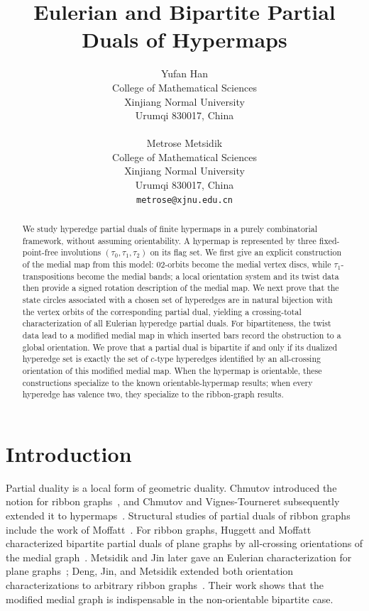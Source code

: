 \documentclass{article}
\title{Eulerian and Bipartite Partial Duals of Hypermaps}
\author{
 Yufan Han \\
  College of Mathematical Sciences\\
  Xinjiang Normal University\\
  Urumqi 830017, China \\
  \texttt{} \\
   \And
 Metrose Metsidik \\
  College of Mathematical Sciences\\
  Xinjiang Normal University\\
  Urumqi 830017, China \\
  \texttt{metrose@xjnu.edu.cn} \\
}
\theoremstyle{definition}
\theoremstyle{remark}
\begin{document}
\maketitle
\begin{abstract}
We study hyperedge partial duals of finite hypermaps in a purely combinatorial framework, without assuming orientability. A hypermap is represented by three fixed-point-free involutions $(\tau_0,\tau_1,\tau_2)$ on its flag set. We first give an explicit construction of the medial map from this model: $02$-orbits become the medial vertex discs, while $\tau_1$-transpositions become the medial bands; a local orientation system and its twist data then provide a signed rotation description of the medial map. We next prove that the state circles associated with a chosen set of hyperedges are in natural bijection with the vertex orbits of the corresponding partial dual, yielding a crossing-total characterization of all Eulerian hyperedge partial duals. For bipartiteness, the twist data lead to a modified medial map in which inserted bars record the obstruction to a global orientation. We prove that a partial dual is bipartite if and only if its dualized hyperedge set is exactly the set of $c$-type hyperedges identified by an all-crossing orientation of this modified medial map. When the hypermap is orientable, these constructions specialize to the known orientable-hypermap results; when every hyperedge has valence two, they specialize to the ribbon-graph results.
\end{abstract}

\section{Introduction}

Partial duality is a local form of geometric duality. Chmutov introduced the notion for ribbon graphs~\cite{Chmutov2009}, and Chmutov and Vignes-Tourneret subsequently extended it to hypermaps~\cite{ChmutovVignes2022}. Structural studies of partial duals of ribbon graphs include the work of Moffatt~\cite{Moffatt2011,Moffatt2013}. For ribbon graphs, Huggett and Moffatt characterized bipartite partial duals of plane graphs by all-crossing orientations of the medial graph~\cite{HuggettMoffatt2013}. Metsidik and Jin later gave an Eulerian characterization for plane graphs~\cite{MetsidikJin2018}; Deng, Jin, and Metsidik extended both orientation characterizations to arbitrary ribbon graphs~\cite{DengJinMetsidik2020}. Their work shows that the modified medial graph is indispensable in the non-orientable bipartite case.
\end{document}
